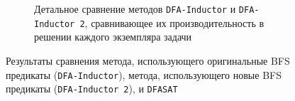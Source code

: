 \begin{figure}[ht]
\begin{subfigure}[b]{0.48\textwidth}
    \caption{Детальное сравнение методов \texttt{DFA-Inductor} и \texttt{DFA-Inductor~2}, сравнивающее их производительность в решении каждого экземпляра задачи}
    \label{img:plots:scatter}
  \end{subfigure}
  \caption{Результаты сравнения метода, использующего оригинальные BFS предикаты (\texttt{DFA-Inductor}), метода, использующего новые BFS предикаты (\texttt{DFA-Inductor~2}), и \texttt{DFASAT}}
  \label{img:plots}
\end{figure}




\chresults{\ref{sec:space}}

